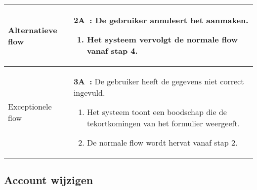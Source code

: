 \documentclass{article}
\begin{document}
\begin{tabularx}{\textwidth}{ | l | X |}
  Alternatieve flow & 
 \textbf{2A~:}  De gebruiker annuleert het aanmaken.
 	\begin{enumerate}[label=\alph*]
 		\item Het systeem vervolgt de normale flow vanaf stap 4.
 	\end{enumerate}
 \\ 
 \hline
 
 Exceptionele flow & 
 \textbf{3A~:}  De gebruiker heeft de gegevens niet correct ingevuld.
 	\begin{enumerate}[label=\alph*]
 		\item Het systeem toont een boodschap die de tekortkomingen van het formulier weergeeft.
 		\item De normale flow wordt hervat vanaf stap 2.
 	\end{enumerate}
 \\ 
 \hline
 
 
\end{tabularx}

\subsection{Account wijzigen}
\end{document}
